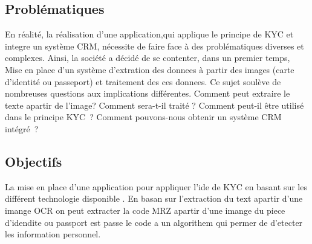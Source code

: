 \subsection{Problématiques}	

En réalité, la réalisation d'une application,qui applique le principe de KYC et integre un  système CRM,
nécessite
de faire face à des problématiques diverses et complexes. Ainsi, la société a décidé de se contenter,
dans un premier temps, Mise en place d’un système d’extration des donnees à partir des images (carte d'identité ou passeport) et traitement des ces donnees.
Ce sujet soulève de nombreuses questions aux implications différentes. Comment peut extraire le texte apartir de l'image? Comment sera-t-il traité ? Comment peut-il être utilisé dans le principe KYC ? Comment pouvons-nous obtenir un système CRM intégré ?


\subsection{Objectifs}

La mise en place d'une application pour appliquer l'ide de KYC en basant sur les différent technologie disponible . En basan sur l'extraction du text apartir d'une imange OCR on peut extracter la code MRZ apartir d'une imange du piece d'idendite ou passport est passe le code a un algorithem qui permer de d'etecter les information personnel.




